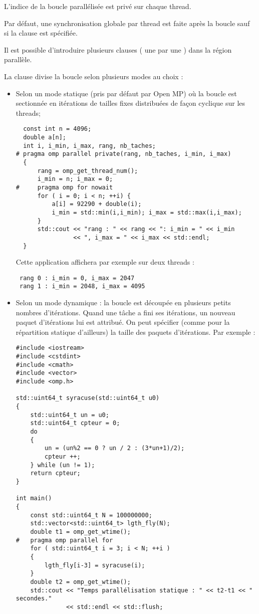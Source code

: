 \documentclass[fleqn,11pt]{article}
\begin{document}
L'indice de la boucle parallélisée est privé sur chaque thread.

Par défaut, une synchronisation globale par thread est faite après la boucle sauf si la clause \verb@nowait@
est spécifiée.

Il est possible d'introduire plusieurs clauses \verb@for@ ( une par une ) dans la région parallèle.

La clause \verb@schedule@ divise la boucle selon plusieurs modes au choix :

\begin{itemize}
 \item Selon un mode statique (pris par défaut par Open MP) où la boucle est sectionnée en itérations de tailles fixes distribuées de façon cyclique sur les threads;
 \begin{lstlisting}
  const int n = 4096;
  double a[n];
  int i, i_min, i_max, rang, nb_taches;
# pragma omp parallel private(rang, nb_taches, i_min, i_max)
  {
      rang = omp_get_thread_num();
      i_min = n; i_max = 0;
#     pragma omp for nowait
      for ( i = 0; i < n; ++i) {
          a[i] = 92290 + double(i);
          i_min = std::min(i,i_min); i_max = std::max(i,i_max);
      }
      std::cout << "rang : " << rang << ": i_min = " << i_min
                << ", i_max = " << i_max << std::endl;
  }
 \end{lstlisting}
 Cette application affichera par exemple sur deux threads :
 \begin{verbatim}
 rang 0 : i_min = 0, i_max = 2047
 rang 1 : i_min = 2048, i_max = 4095 
 \end{verbatim}

 \item Selon un mode dynamique : la boucle est découpée en plusieurs petits nombres d'itérations. Quand une tâche a fini ses itérations, un nouveau paquet d'itérations lui est attribué. On peut spécifier (comme pour
 la répartition statique d'ailleurs) la taille des paquets d'itérations.
 Par exemple :
\begin{lstlisting}
#include <iostream>
#include <cstdint>
#include <cmath>
#include <vector>
#include <omp.h>

std::uint64_t syracuse(std::uint64_t u0)
{
    std::uint64_t un = u0;
    std::uint64_t cpteur = 0;
    do
    {
        un = (un%2 == 0 ? un / 2 : (3*un+1)/2);
        cpteur ++;
    } while (un != 1);
    return cpteur;
}

int main()
{
    const std::uint64_t N = 100000000;
    std::vector<std::uint64_t> lgth_fly(N);
    double t1 = omp_get_wtime();
#   pragma omp parallel for
    for ( std::uint64_t i = 3; i < N; ++i )
    {
        lgth_fly[i-3] = syracuse(i);
    }
    double t2 = omp_get_wtime();
    std::cout << "Temps parallélisation statique : " << t2-t1 << " secondes."
              << std::endl << std::flush;


\end{lstlisting}
\end{itemize}
\end{document}
